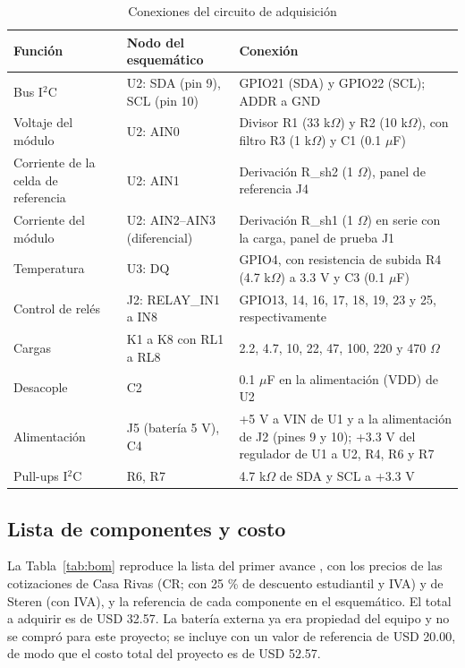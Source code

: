 \documentclass[10pt,letterpaper,twocolumn]{article}
\begin{document}
\begin{table}[!t]
\centering
\caption{Conexiones del circuito de adquisición}
\label{tab:conex}
\footnotesize
\begin{tabularx}{\textwidth}{@{}p{3.3cm}p{3.6cm}X@{}}
\toprule
Función & Nodo del esquemático & Conexión\\
\midrule
Bus I$^2$C & U2: SDA (pin 9), SCL (pin 10) & GPIO21 (SDA) y GPIO22 (SCL); ADDR a GND\\
Voltaje del módulo & U2: AIN0 & Divisor R1 (33 k$\Omega$) y R2 (10 k$\Omega$), con filtro R3 (1 k$\Omega$) y C1 (0.1 $\mu$F)\\
Corriente de la celda de referencia & U2: AIN1 & Derivación R\_sh2 (1 $\Omega$), panel de referencia J4\\
Corriente del módulo & U2: AIN2--AIN3 (diferencial) & Derivación R\_sh1 (1 $\Omega$) en serie con la carga, panel de prueba J1\\
Temperatura & U3: DQ & GPIO4, con resistencia de subida R4 (4.7 k$\Omega$) a 3.3 V y C3 (0.1 $\mu$F)\\
Control de relés & J2: RELAY\_IN1 a IN8 & GPIO13, 14, 16, 17, 18, 19, 23 y 25, respectivamente\\
Cargas & K1 a K8 con RL1 a RL8 & 2.2, 4.7, 10, 22, 47, 100, 220 y 470 $\Omega$\\
Desacople & C2 & 0.1 $\mu$F en la alimentación (VDD) de U2\\
Alimentación & J5 (batería 5 V), C4 & +5 V a VIN de U1 y a la alimentación de J2 (pines 9 y 10); +3.3 V del regulador de U1 a U2, R4, R6 y R7\\
Pull-ups I$^2$C & R6, R7 & 4.7 k$\Omega$ de SDA y SCL a +3.3 V\\
\bottomrule
\end{tabularx}
\end{table}

\subsection{Lista de componentes y costo}
La Tabla~\ref{tab:bom} reproduce la lista del primer avance \cite{avance1}, con los precios de las cotizaciones de Casa Rivas (CR; con 25 \% de descuento estudiantil y IVA) y de Steren (con IVA), y la referencia de cada componente en el esquemático. El total a adquirir es de USD 32.57. La batería externa ya era propiedad del equipo y no se compró para este proyecto; se incluye con un valor de referencia de USD 20.00, de modo que el costo total del proyecto es de USD 52.57.
\end{document}

